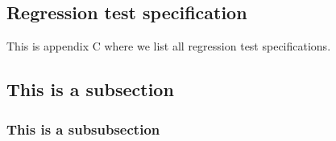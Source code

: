 \documentclass[a4paper]{article}
\begin{document}
\begin{appendices}
\newpage
\section{Regression test specification}
This is appendix C where we list all regression test specifications.

\subsection{This is a subsection}

\subsubsection{This is a subsubsection}
\end{appendices}
\end{document}
